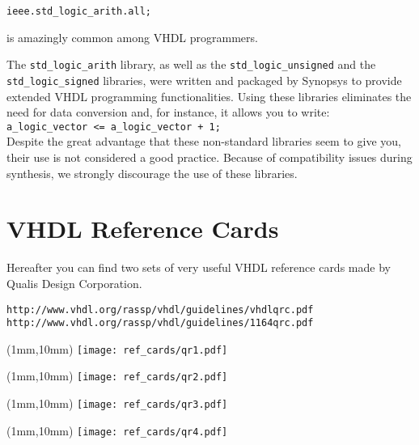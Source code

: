 \noindent
\texttt{ieee.std\_logic\_arith.all;}

\noindent
is amazingly common among VHDL programmers. 

The \texttt{std\_logic\_arith} library, as well as the \texttt{std\_logic\_unsigned} and the \texttt{std\_logic\_signed} libraries, were written and packaged by Synopsys to provide extended VHDL programming functionalities. Using these libraries eliminates the need for data conversion and, for instance, it allows you to write:\\
\texttt{a\_logic\_vector <= a\_logic\_vector + 1;}\\
Despite the great advantage that these non-standard libraries seem to give you, their use is not considered a good practice. Because of compatibility issues during synthesis, we strongly discourage the use of these libraries.

\chapter{VHDL Reference Cards}
Hereafter you can find two sets of very useful VHDL reference cards made by Qualis Design Corporation.

\noindent
\begin{verbatim}
http://www.vhdl.org/rassp/vhdl/guidelines/vhdlqrc.pdf
http://www.vhdl.org/rassp/vhdl/guidelines/1164qrc.pdf
\end{verbatim}

\newpage\clearpage
\thispagestyle{empty}
\begin{textblock*}{148mm}(1mm,10mm)
\texttt{[image: ref\_cards/qr1.pdf]}
\end{textblock*}
\null\newpage

\thispagestyle{empty}
\begin{textblock*}{148mm}(1mm,10mm)
\texttt{[image: ref\_cards/qr2.pdf]}
\end{textblock*}
\null\newpage

\thispagestyle{empty}
\begin{textblock*}{148mm}(1mm,10mm)
\texttt{[image: ref\_cards/qr3.pdf]}
\end{textblock*}
\null\newpage

\thispagestyle{empty}
\begin{textblock*}{148mm}(1mm,10mm)
\texttt{[image: ref\_cards/qr4.pdf]}
\end{textblock*}
\null\newpage

